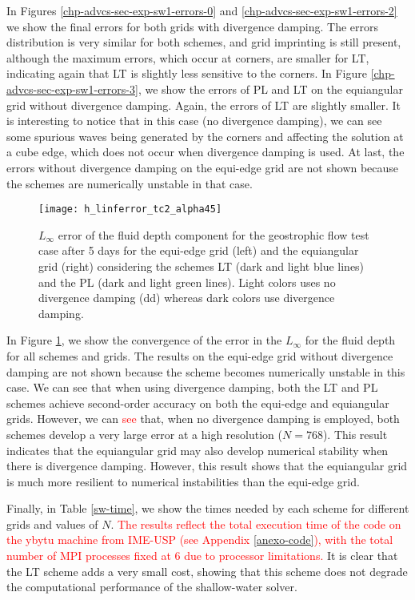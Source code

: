 In Figures \ref{chp-advcs-sec-exp-sw1-errors-0} and \ref{chp-advcs-sec-exp-sw1-errors-2} we show the final errors
for both grids with divergence damping.
The errors distribution is very similar for both schemes, and grid imprinting is still present, 
although the maximum errors, which occur at corners, are smaller for LT, indicating again that LT is slightly less sensitive to the corners.
In Figure \ref{chp-advcs-sec-exp-sw1-errors-3}, we show the errors of PL and LT on the equiangular grid without divergence damping.
Again, the errors of LT are slightly smaller. It is interesting to notice that in this case (no divergence damping), 
we can see some spurious waves being generated by the corners and affecting the solution at a cube edge, which does not occur when divergence damping is used.
At last, the errors without divergence damping on the equi-edge grid are not shown because the schemes are numerically unstable in that case.

\begin{figure}[!htb]
	\centering
	\texttt{[image: h\_linferror\_tc2\_alpha45]}
	\caption{$L_{\infty}$ error of the fluid depth component for the geostrophic flow test case after 5 days
		for the equi-edge grid (left) and the equiangular grid (right)
		considering the schemes LT (dark and light blue lines) and the PL (dark and light green lines). 
		Light colors uses no divergence damping (dd) whereas dark colors use divergence damping.\label{chp-advcs-sec-exp-sw-linf}}
\end{figure}

\newpage
In Figure \ref{chp-advcs-sec-exp-sw-linf}, we show the convergence of the error in the $L_{\infty}$ for the fluid depth for all schemes and grids.
The results on the equi-edge grid without divergence damping are not shown because the scheme becomes numerically unstable in this case.
We can see that when using divergence damping, both the LT and PL schemes achieve second-order accuracy on both the equi-edge and equiangular grids.
However, we can \textcolor{red}{see} that, when no divergence damping is employed, both schemes develop a very large error at a high resolution ($N=768$).
This result indicates that the equiangular grid may also develop numerical stability when there is divergence damping. 
However, this result shows that the equiangular grid is much more resilient to numerical instabilities than the equi-edge grid.

Finally, in Table \ref{sw-time}, we show the times needed by each scheme for different grids and values of $N$.
\textcolor{red}{The results reflect the total execution time of the code on the ybytu machine from IME-USP (see Appendix \ref{anexo-code}), 
with the total number of MPI processes fixed at 6 due to processor limitations.}
It is clear that the LT scheme adds a very small cost, showing that this scheme does not degrade the computational performance of the shallow-water solver.

